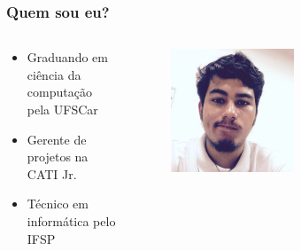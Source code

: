 \begin{frame}
	\frametitle{Quem sou eu?}

	\begin{columns}
		\begin{column}{0.5\textwidth}
			\begin{itemize}
				\item Graduando em ciência da computação
					pela UFSCar
				\item Gerente de projetos na CATI Jr.
				\item Técnico em informática pelo IFSP
			\end{itemize}
		\end{column}

		\begin{column}{0.5\textwidth}
    		\begin{center}
				\begin{figure}
					\includegraphics[width=0.5\textwidth]{figuras/Cati}
					\label{figure:me}
				\end{figure}
     		\end{center}
		\end{column}
	\end{columns}

\end{frame}
